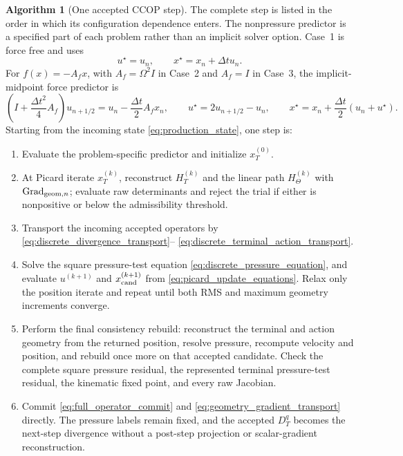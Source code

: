 \documentclass[11pt]{article}
\theoremstyle{plain}
\theoremstyle{definition}
\newtheorem{ccopalgorithm}{Algorithm}
\theoremstyle{remark}
\newcommand{\Grad}{\operatorname{Grad}}
\newcommand{\dt}{\Delta t}
\newcommand{\Th}{\Theta}
\begin{document}
\begin{ccopalgorithm}[One accepted CCOP step]
\label{alg:accepted_ccop_step}
The complete step is listed in the order in which its configuration dependence
enters.
The nonpressure predictor is a specified part of each problem rather than an
implicit solver option.  Case~1 is force free and uses
\begin{equation}
 u^\star=u_n,\qquad x^\star=x_n+\dt u_n.
 \label{eq:force_free_predictor}
\end{equation}
For $f(x)=-A_fx$, with $A_f=\Omega^2I$ in Case~2 and $A_f=I$ in Case~3,
the implicit-midpoint force predictor is
\begin{equation}
 \left(I+\frac{\dt^2}{4}A_f\right)u_{n+1/2}
 =u_n-\frac{\dt}{2}A_fx_n,\qquad
 u^\star=2u_{n+1/2}-u_n,\qquad
 x^\star=x_n+\frac{\dt}{2}(u_n+u^\star).
 \label{eq:conservative_force_predictor}
\end{equation}
Starting from the incoming state \eqref{eq:production_state}, one step is:
\begin{enumerate}[label=\textbf{\arabic*.},leftmargin=2.2em,itemsep=0.25em]
\item Evaluate the problem-specific predictor and initialize $x_T^{(0)}$.
\item At Picard iterate $x_T^{(k)}$, reconstruct $H_T^{(k)}$ and the linear
path $H_\Th^{(k)}$ with $\Grad_{{\rm geom},n}$; evaluate raw determinants and
reject the trial if either is nonpositive or below the admissibility threshold.
\item Transport the incoming accepted operators by
\eqref{eq:discrete_divergence_transport}--
\eqref{eq:discrete_terminal_action_transport}.
\item Solve the square pressure-test equation
\eqref{eq:discrete_pressure_equation}, and evaluate
$u^{(k+1)}$ and $x_{\rm cand}^{(k+1)}$ from
\eqref{eq:picard_update_equations}.  Relax only the position iterate and repeat
until both RMS and maximum geometry increments converge.
\item Perform the final consistency rebuild: reconstruct the terminal and action geometry
from the returned position, resolve pressure, recompute velocity and position,
and rebuild once more on that accepted candidate.  Check the complete square
pressure residual, the represented terminal pressure-test residual, the
kinematic fixed point, and every raw Jacobian.
\item Commit \eqref{eq:full_operator_commit} and
\eqref{eq:geometry_gradient_transport} directly.  The pressure labels remain
fixed, and the accepted $D_T^q$ becomes the next-step divergence without a
post-step projection or scalar-gradient reconstruction.
\end{enumerate}
\end{ccopalgorithm}
\end{document}
